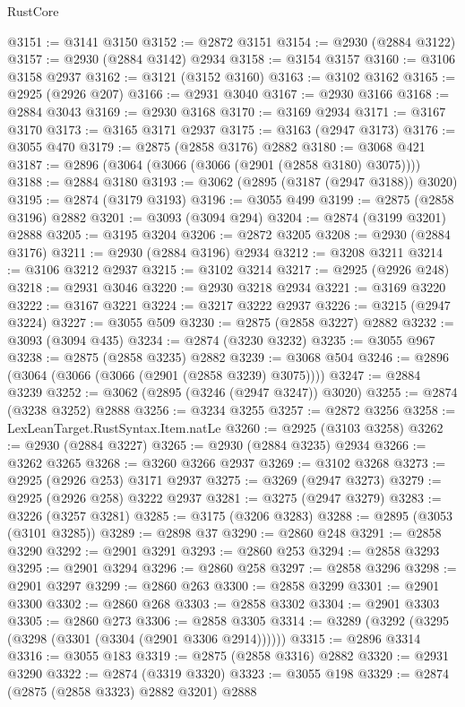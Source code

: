 \begin{lexlean}{RustCore}
\begin{coremodule}
@3151 := @3141 @3150
@3152 := @2872 @3151
@3154 := @2930 (@2884 @3122)
@3157 := @2930 (@2884 @3142) @2934
@3158 := @3154 @3157
@3160 := @3106 @3158 @2937
@3162 := @3121 (@3152 @3160)
@3163 := @3102 @3162
@3165 := @2925 (@2926 @207)
@3166 := @2931 @3040
@3167 := @2930 @3166
@3168 := @2884 @3043
@3169 := @2930 @3168
@3170 := @3169 @2934
@3171 := @3167 @3170
@3173 := @3165 @3171 @2937
@3175 := @3163 (@2947 @3173)
@3176 := @3055 @470
@3179 := @2875 (@2858 @3176) @2882
@3180 := @3068 @421
@3187 := @2896 (@3064 (@3066 (@3066 (@2901 (@2858 @3180) @3075))))
@3188 := @2884 @3180
@3193 := @3062 (@2895 (@3187 (@2947 @3188)) @3020)
@3195 := @2874 (@3179 @3193)
@3196 := @3055 @499
@3199 := @2875 (@2858 @3196) @2882
@3201 := @3093 (@3094 @294)
@3204 := @2874 (@3199 @3201) @2888
@3205 := @3195 @3204
@3206 := @2872 @3205
@3208 := @2930 (@2884 @3176)
@3211 := @2930 (@2884 @3196) @2934
@3212 := @3208 @3211
@3214 := @3106 @3212 @2937
@3215 := @3102 @3214
@3217 := @2925 (@2926 @248)
@3218 := @2931 @3046
@3220 := @2930 @3218 @2934
@3221 := @3169 @3220
@3222 := @3167 @3221
@3224 := @3217 @3222 @2937
@3226 := @3215 (@2947 @3224)
@3227 := @3055 @509
@3230 := @2875 (@2858 @3227) @2882
@3232 := @3093 (@3094 @435)
@3234 := @2874 (@3230 @3232)
@3235 := @3055 @967
@3238 := @2875 (@2858 @3235) @2882
@3239 := @3068 @504
@3246 := @2896 (@3064 (@3066 (@3066 (@2901 (@2858 @3239) @3075))))
@3247 := @2884 @3239
@3252 := @3062 (@2895 (@3246 (@2947 @3247)) @3020)
@3255 := @2874 (@3238 @3252) @2888
@3256 := @3234 @3255
@3257 := @2872 @3256
@3258 := LexLeanTarget.RustSyntax.Item.natLe
@3260 := @2925 (@3103 @3258)
@3262 := @2930 (@2884 @3227)
@3265 := @2930 (@2884 @3235) @2934
@3266 := @3262 @3265
@3268 := @3260 @3266 @2937
@3269 := @3102 @3268
@3273 := @2925 (@2926 @253) @3171 @2937
@3275 := @3269 (@2947 @3273)
@3279 := @2925 (@2926 @258) @3222 @2937
@3281 := @3275 (@2947 @3279)
@3283 := @3226 (@3257 @3281)
@3285 := @3175 (@3206 @3283)
@3288 := @2895 (@3053 (@3101 @3285))
@3289 := @2898 @37
@3290 := @2860 @248
@3291 := @2858 @3290
@3292 := @2901 @3291
@3293 := @2860 @253
@3294 := @2858 @3293
@3295 := @2901 @3294
@3296 := @2860 @258
@3297 := @2858 @3296
@3298 := @2901 @3297
@3299 := @2860 @263
@3300 := @2858 @3299
@3301 := @2901 @3300
@3302 := @2860 @268
@3303 := @2858 @3302
@3304 := @2901 @3303
@3305 := @2860 @273
@3306 := @2858 @3305
@3314 := @3289 (@3292 (@3295 (@3298 (@3301 (@3304 (@2901 @3306 @2914))))))
@3315 := @2896 @3314
@3316 := @3055 @183
@3319 := @2875 (@2858 @3316) @2882
@3320 := @2931 @3290
@3322 := @2874 (@3319 @3320)
@3323 := @3055 @198
@3329 := @2874 (@2875 (@2858 @3323) @2882 @3201) @2888

\end{coremodule}
\end{lexlean}
